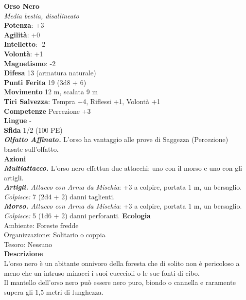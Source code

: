 \begin{multicols}{2}
\medskip\textbf{Orso Nero}\\
\emph{Media bestia, disallineato}\\
\textbf{Potenza}: +3\\
\textbf{Agilità}: +0\\
\textbf{Intelletto}: -2\\
\textbf{Volontà}: +1\\
\textbf{Magnetismo}: -2\\
\textbf{Difesa} 13 (armatura naturale)\\
\textbf{Punti Ferita} 19 (3d8 + 6)\\
\textbf{Movimento} 12 m, scalata 9 m\\
\textbf{Tiri Salvezza}: Tempra +4, Riflessi +1, Volontà +1 \\
\textbf{Competenze} Percezione +3\\
\textbf{Lingue} -\\
\textbf{Sfida} 1/2 (100 PE)\smallskip\\
\emph{\textbf{Olfatto Affinato.}} L'orso ha vantaggio alle prove di Saggezza (Percezione) basate sull'olfatto.\\
\smallskip\textbf{Azioni}\\
\emph{\textbf{Multiattacco.}} L'orso nero effettua due attacchi: uno con il morso e uno con gli artigli.\\
\emph{\textbf{Artigli.} Attacco con Arma da Mischia}: +3 a colpire, portata 1 m, un bersaglio.\\
\emph{Colpisce:} 7 (2d4 + 2) danni taglienti.\\
\emph{\textbf{Morso.} Attacco con Arma da Mischia}: +3 a colpire, portata 1 m, un bersaglio.\\
\emph{Colpisce:} 5 (1d6 + 2) danni perforanti.
\textbf{Ecologia}\\
Ambiente: Foreste fredde\\
Organizzazione: Solitario o coppia\\
Tesoro: Nessuno\\
\textbf{Descrizione}\\
L'orso nero è un abitante onnivoro della foresta che di solito non è pericoloso a meno che un intruso minacci i suoi cucccioli o le sue fonti di cibo.\\
Il mantello dell'orso nero può essere nero puro, biondo o cannella e raramente supera gli 1,5 metri di lunghezza. \\



\end{multicols}
